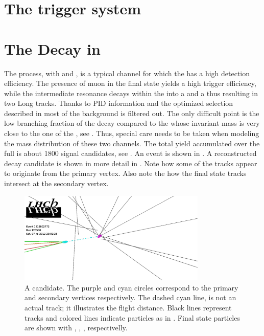 \section{The trigger system}
\label{det_trigger}


\section{The \BsJpsiKst Decay in \lhcb}
\label{BspsiKst_at_lhcb}

The \BsJpsiKst process, with \Jpsimumu and \KstKpi, is a typical channel for which the \lhcb has a high detection efficiency.
The presence of muon in the final state yields a high trigger efficiency, while the intermediate
\Kstarz resonance decays within the \velo into a \Kp and a \pim thus resulting in two Long tracks.
Thanks to PID information and the optimized selection described in  most of the background
is filtered out. The only difficult point is the low branching fraction of the \BsJpsiKst decay
compared to the \BdJpsiKst whose invariant mass is very close to the one of the \BsJpsiKst, see .
Thus, special care needs to be taken when modeling the mass distribution of these two channels.
The total \BsJpsiKst yield accumulated over the full \runone is about 1800 signal candidates, see .
An \lhcb event is shown in . A reconstructed \BsJpsiKst decay candidate is shown in
more detail in . Note how some of the \velo tracks appear to originate from the
primary vertex. Also note the how the \Bs final state tracks intersect at the secondary vertex.

\begin{figure}[t]
  \centering
 \includegraphics[width=0.8\textwidth,trim=0cm 0cm 17cm 0cm, clip=true]{Figures/Chapter2/jpsikst_event.pdf}
  \caption{A \BsJpsiKst candidate. The purple and cyan circles correspond to the primary and secondary
           vertices respectively. The dashed cyan line, is not an actual track; it illustrates the \Bs flight distance.
            Black lines represent \velo tracks and colored lines indicate particles as in .
            Final state particles are shown with {\color{green}\mmu}, {\color{green}\mmu}, {\color{red}\kaon}, {\color{orange}\pion} respectivelly.}
  \label{det_jpsikst_cand}
\end{figure}

